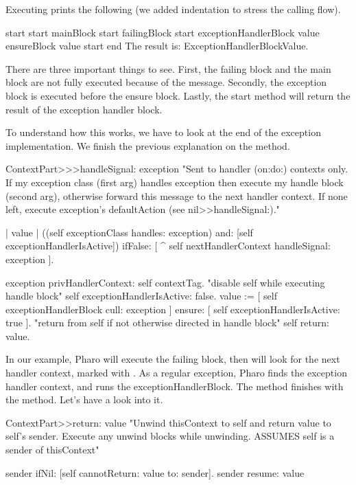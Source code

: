 Executing  prints the following (we added indentation to stress the calling flow).

\begin{code}{}
start start
	mainBlock start
		failingBlock start
			exceptionHandlerBlock value
			ensureBlock value
start  end
The result is: ExceptionHandlerBlockValue.
\end{code}

There are three important things to see. First, the failing block and the main block are not fully executed because of the  message. Secondly, the exception block is executed before the ensure block. Lastly, the start method will return the result of the exception handler block.

To understand how this works, we have to look at the end of the exception implementation. We finish the previous explanation on the  method.

\begin{code}{}
ContextPart>>>handleSignal: exception
	"Sent to handler (on:do:) contexts only.  If my exception class (first arg) handles exception then execute my handle block (second arg), otherwise forward this message to the next handler context.  If none left, execute exception's defaultAction (see nil>>handleSignal:)."

	| value |
	((self exceptionClass handles: exception)
	and: [self exceptionHandlerIsActive]) 
		ifFalse: [ ^ self nextHandlerContext handleSignal: exception ].

	exception privHandlerContext: self contextTag.
	"disable self while executing handle block"
	self exceptionHandlerIsActive: false. 
	value := [ self exceptionHandlerBlock cull: exception ]
		ensure: [ self exceptionHandlerIsActive: true ].
	"return from self if not otherwise directed in handle block"
	self return: value.  
\end{code}

In our example, Pharo will execute the failing block, then will look for the next handler context, marked with . As a regular exception, Pharo finds the exception handler context, and runs the exceptionHandlerBlock.  The method  finishes with the  method. Let's have a look into it.

\begin{code}{}
ContextPart>>return: value
	"Unwind thisContext to self and return value to self's sender.  Execute any unwind blocks while unwinding.  ASSUMES self is a sender of thisContext"

	sender ifNil: [self cannotReturn: value to: sender].
	sender resume: value
\end{code}


